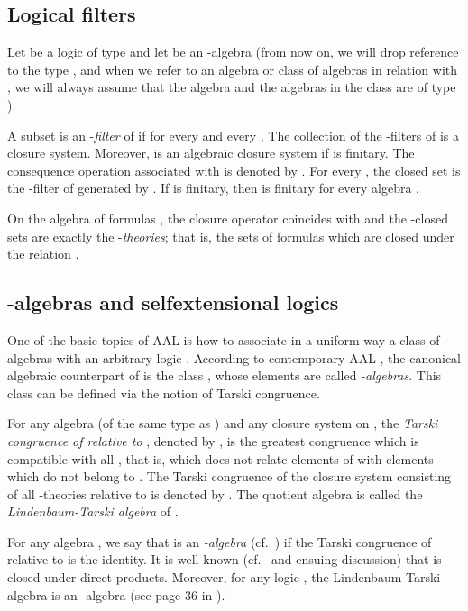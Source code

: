 \documentclass{llncs}
\numberwithin{equation}{section}
\begin{document}
\subsection{Logical filters}
Let  be a logic of type  and let  be an -algebra (from now on, we will drop reference to the type , and when we refer to an algebra or class of algebras in relation with , we will always assume that the algebra and the algebras in the class are of type ).

A subset  is  an -\textit{filter} of  if for every  and every ,  The collection  of the -filters of  is a closure system. Moreover,  is an algebraic closure system if
 is finitary. The consequence operation associated with  is denoted by . For every , the closed set
 is the -filter of  generated by . If  is finitary, then  is finitary for every algebra .

On the algebra of formulas  , the closure operator  coincides with  and the -closed sets are exactly the -\textit{theories}; that is, the sets of formulas which are closed under the relation .

\subsection{-algebras and selfextensional logics}\label{subsec:Salgebras}

One of the basic topics of AAL is how to associate in a uniform way a class of algebras with an arbitrary logic . According to contemporary AAL \cite{FJa09}, the canonical algebraic counterpart of   is the class , whose elements are called \emph{-algebras}. This class can be defined via the notion of Tarski congruence.

For any algebra  (of the same type as ) and any closure system  on ,
the \emph{Tarski congruence of  relative to },  denoted by ,
is the greatest congruence which is compatible with all , that is, which does not relate elements of  with elements which do not belong to .
The Tarski congruence of the closure system consisting of all -theories relative to  is denoted by . The quotient algebra  is called the \emph{Lindenbaum-Tarski algebra} of .

For any algebra , we say that  is an \emph{-algebra}  (cf.\ \cite[Definition 2.16]{FJa09}) if the Tarski congruence of  relative to  is the identity. It is well-known (cf.\ \cite[Theorem 2.23]{FJa09} and ensuing discussion) that  is closed under direct products. Moreover, for any logic , the Lindenbaum-Tarski algebra is an -algebra (see page 36 in \cite{FJa09}).
\end{document}
